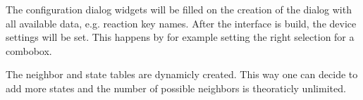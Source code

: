 The configuration dialog widgets will be filled on the creation of the dialog with all available data, e.g. reaction key names. After the interface is build, the device settings will be set. This happens by for example setting the right selection for a combobox.

The neighbor and state tables are dynamicly created. This way one can decide to add more states and the number of possible neighbors is theoraticly unlimited.


